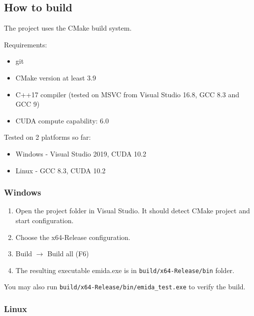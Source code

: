 \subsection*{How to build}
The project uses the CMake build system.

\vspace{0.3cm}
\noindent
Requirements:
\begin{itemize}
	\item git
	\item CMake version at least 3.9
	\item C++17 compiler (tested on MSVC from Visual Studio 16.8, GCC 8.3 and GCC 9)
	\item CUDA compute capability: 6.0
\end{itemize}
Tested on 2 platforms so far:
\begin{itemize}
	\item Windows - Visual Studio 2019, CUDA 10.2
	\item Linux - GCC 8.3, CUDA 10.2
\end{itemize}

\subsubsection*{Windows}

\begin{enumerate}
	\item Open the project folder in Visual Studio. It should detect CMake project and start configuration.
	\item Choose the x64-Release configuration.
	\item Build $\rightarrow$ Build all (F6)
	\item The resulting executable emida.exe is in \texttt{build/x64-Release/bin} folder.
\end{enumerate}
You may also run \texttt{build/x64-Release/bin/emida\_test.exe} to verify the build.

\subsubsection*{Linux}

